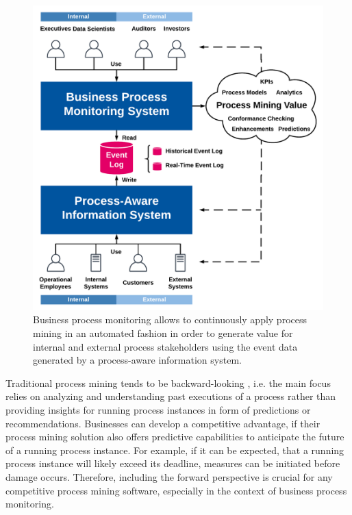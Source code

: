 \begin{figure}[htbp!]
	\centering
	\includegraphics[width=\textwidth]{figures/process-monitoring}
	\caption[Process mining in the context of business process monitoring]{Business process monitoring allows to continuously apply process mining in an automated fashion in order to generate value for internal and external process stakeholders using the event data generated by a process-aware information system.}
	\label{fig:process-monitoring}
\end{figure}

Traditional process mining tends to be backward-looking \cite{DBLP:conf/scsc/Aalst18}, i.e. the main focus relies on analyzing and understanding past executions of a process rather than providing insights for running process instances in form of predictions or recommendations.
Businesses can develop a competitive advantage, if their process mining solution also offers predictive capabilities to anticipate the future of a running process instance.
For example, if it can be expected, that a running process instance will likely exceed its deadline, measures can be initiated before damage occurs.
Therefore, including the forward perspective is crucial for any competitive process mining software, especially in the context of business process monitoring.

